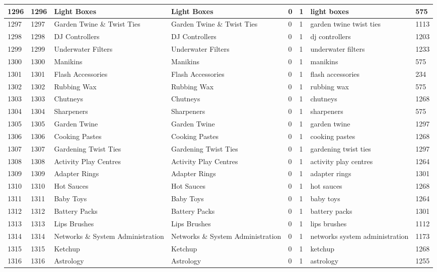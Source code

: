 \begin{longtable}{|l|l|l|l|l|l|l|l|}
1296 & 1296 & Light Boxes & Light Boxes & 0 & 1 & light boxes & 575 \\ \hline 
1297 & 1297 & Garden Twine \& Twist Ties & Garden Twine \& Twist Ties & 0 & 1 & garden twine twist ties & 1113 \\ \hline 
1298 & 1298 & DJ Controllers & DJ Controllers & 0 & 1 & dj controllers & 1203 \\ \hline 
1299 & 1299 & Underwater Filters & Underwater Filters & 0 & 1 & underwater filters & 1233 \\ \hline 
1300 & 1300 & Manikins & Manikins & 0 & 1 & manikins & 575 \\ \hline 
1301 & 1301 & Flash Accessories & Flash Accessories & 0 & 1 & flash accessories & 234 \\ \hline 
1302 & 1302 & Rubbing Wax & Rubbing Wax & 0 & 1 & rubbing wax & 575 \\ \hline 
1303 & 1303 & Chutneys & Chutneys & 0 & 1 & chutneys & 1268 \\ \hline 
1304 & 1304 & Sharpeners & Sharpeners & 0 & 1 & sharpeners & 575 \\ \hline 
1305 & 1305 & Garden Twine & Garden Twine & 0 & 1 & garden twine & 1297 \\ \hline 
1306 & 1306 & Cooking Pastes & Cooking Pastes & 0 & 1 & cooking pastes & 1268 \\ \hline 
1307 & 1307 & Gardening Twist Ties & Gardening Twist Ties & 0 & 1 & gardening twist ties & 1297 \\ \hline 
1308 & 1308 & Activity Play Centres & Activity Play Centres & 0 & 1 & activity play centres & 1264 \\ \hline 
1309 & 1309 & Adapter Rings & Adapter Rings & 0 & 1 & adapter rings & 1301 \\ \hline 
1310 & 1310 & Hot Sauces & Hot Sauces & 0 & 1 & hot sauces & 1268 \\ \hline 
1311 & 1311 & Baby Toys & Baby Toys & 0 & 1 & baby toys & 1264 \\ \hline 
1312 & 1312 & Battery Packs & Battery Packs & 0 & 1 & battery packs & 1301 \\ \hline 
1313 & 1313 & Lips Brushes & Lips Brushes & 0 & 1 & lips brushes & 1112 \\ \hline 
1314 & 1314 & Networks \& System Administration & Networks \& System Administration & 0 & 1 & networks system administration & 1173 \\ \hline 
1315 & 1315 & Ketchup & Ketchup & 0 & 1 & ketchup & 1268 \\ \hline 
1316 & 1316 & Astrology & Astrology & 0 & 1 & astrology & 1255 \\ \hline 

\end{longtable}
